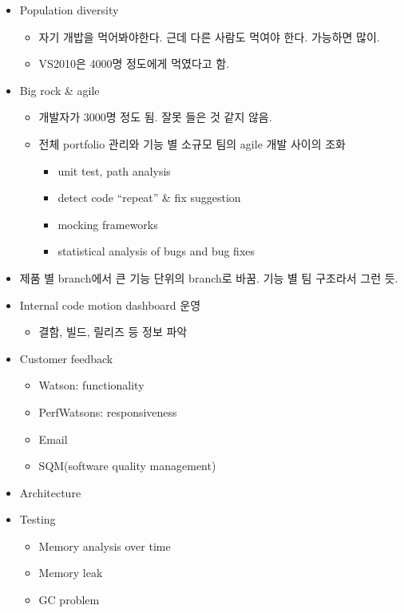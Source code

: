 \documentclass[11pt]{article}
\begin{document}
\begin{itemize}
\item Population diversity
    \begin{itemize}
    \item 자기 개밥을 먹어봐야한다. 근데 다른 사람도 먹여야 한다. 가능하면 많이.
    \item VS2010은 4000명 정도에게 먹였다고 함.
    \end{itemize}
\item Big rock \& agile
    \begin{itemize}
    \item 개발자가 3000명 정도 됨. 잘못 들은 것 같지 않음.
    \item 전체 portfolio 관리와 기능 별 소규모 팀의 agile 개발 사이의 조화
        \begin{itemize}
        \item unit test, path analysis
        \item detect code ``repeat'' \& fix suggestion
        \item mocking frameworks
        \item statistical analysis of bugs and bug fixes
        \end{itemize}
    \end{itemize}
\item 제품 별 branch에서 큰 기능 단위의 branch로 바꿈.  기능 별 팀 구조라서 그런 듯.
\item Internal code motion dashboard 운영
    \begin{itemize}
    \item 결함, 빌드, 릴리즈 등 정보 파악
    \end{itemize}
\item Customer feedback
    \begin{itemize}
    \item Watson: functionality
    \item PerfWatsons: responsiveness
    \item Email
    \item SQM(software quality management)
    \end{itemize}
\item Architecture
\item Testing
    \begin{itemize}
    \item Memory analysis over time
    \item Memory leak
    \item GC problem
    \end{itemize}
\end{itemize}
\end{document}
